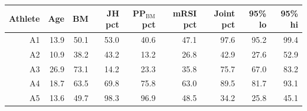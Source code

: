 {\small
\begin{tabular}{rrrrrrrrr}
\toprule
Athlete & Age & BM & JH pct & PP$_{\text{BM}}$ pct & mRSI pct & Joint pct & 95\% lo & 95\% hi \\
\midrule
A1 & 13.9 & 50.1 & 53.0 & 40.6 & 47.1 & 97.6 & 95.2 & 99.4 \\
A2 & 10.9 & 38.2 & 43.2 & 13.2 & 26.8 & 42.9 & 27.6 & 52.9 \\
A3 & 26.9 & 73.1 & 14.2 & 23.3 & 35.8 & 75.7 & 67.0 & 83.2 \\
A4 & 18.7 & 63.5 & 69.8 & 75.8 & 63.0 & 89.5 & 81.7 & 93.1 \\
A5 & 13.6 & 49.7 & 98.3 & 96.9 & 48.5 & 34.2 & 25.8 & 45.1 \\
\bottomrule
\end{tabular}
}
